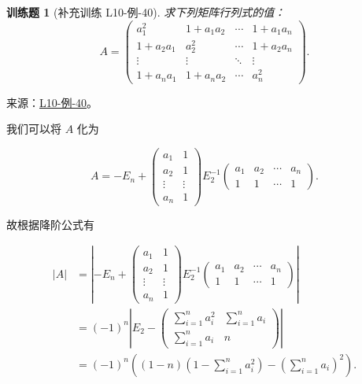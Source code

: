 \documentclass[UTF8,12pt,a4paper,fontset=fandol]{ctexart}
\newtheorem{exercise}{训练题}[section]
\begin{document}
\begin{exercise}[补充训练 L10-例-40]\label{prob:L10-例-40}
求下列矩阵行列式的值：
            \[A=\begin{pmatrix}
                    a_1^2    & 1+a_1a_2   & \cdots & 1+a_1a_n \\
                    1+a_2a_1 & a_2^2    & \cdots & 1+a_2a_n \\
                    \vdots   & \vdots   & \ddots & \vdots   \\
                    1+a_na_1 & 1+a_na_2 & \cdots & a_n^2
                \end{pmatrix}.\]
\end{exercise}
\noindent 来源：\href{https://github.com/yhwu-is/Linear-Algebra-Left-Undone/blob/new/%E8%AE%B2%E4%B9%89/%E4%B8%93%E9%A2%98/10%20%E8%A1%8C%E5%88%97%E5%BC%8F.tex}{L10-例-40}。
\begin{solve}
我们可以将 $A$ 化为

            \[ A = -E_n + \begin{pmatrix}
                    a_1 & 1 \\ a_2 & 1 \\ \vdots & \vdots \\ a_n & 1
                \end{pmatrix} E_2^{-1} \begin{pmatrix}
                    a_1 & a_2 & \cdots & a_n \\ 1 & 1 & \cdots & 1
                \end{pmatrix}. \]

            故根据降阶公式有

            \begin{align*}
                |A| & = \left\vert-E_n +
                \begin{pmatrix}
                    a_1 & 1 \\ a_2 & 1 \\ \vdots & \vdots \\ a_n & 1
                \end{pmatrix} E_2^{-1}
                \begin{pmatrix}
                    a_1 & a_2 & \cdots & a_n \\ 1 & 1 & \cdots & 1
                \end{pmatrix}\right\vert                                                                       \\
                    & = (-1)^n \left|E_2 -
                \begin{pmatrix}
                    \sum\limits_{i=1}^n a_i^2 & \sum\limits_{i=1}^n a_i \\[2ex]
                    \sum\limits_{i=1}^n a_i   & n
                \end{pmatrix}\right|                                                          \\
                    & = (-1)^n \left((1-n)\left(1-\sum\limits_{i=1}^n a_i^2\right) - \left(\sum\limits_{i=1}^n a_i\right)^2\right).
            \end{align*}
\end{solve}
\end{document}

